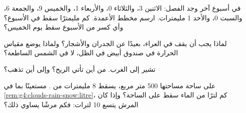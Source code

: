 \begin{exercise}[$\star\star$]\label{exo:g4:clouds-rain-snow:8}
في أسبوع آخر وجد الفصل: الاثنين 3، والثلاثاء 0، والأربعاء 1، والخميس
9، والجمعة 6، والسبت 0، والأحد 1 مليمترات. ارسم مخطط الأعمدة. كم
مليمترًا سقط في الأسبوع؟ وأي كسر من  الأسبوع سقط يوم
الخميس؟
\end{exercise}

\begin{exercise}[$\star\star$]\label{exo:g4:clouds-rain-snow:9}
لماذا يجب أن يقف  في العراء، بعيدًا عن الجدران والأشجار؟ ولماذا
يوضع مقياس الحرارة في صندوق أبيض في الظل، لا في الشمس الساطعة؟
\end{exercise}

\begin{exercise}[$\star\star$]\label{exo:g4:clouds-rain-snow:10}
 تشير إلى الغرب. من أين تأتي الريح؟ وإلى أين
تذهب؟
\end{exercise}

\begin{exercise}[$\star\star\star$]\label{exo:g4:clouds-rain-snow:11}
على ساحة مساحتها 500 متر مربع، يسقط 8 مليمترات من . مستعينًا
بما في \cref{rem:g4:clouds-rain-snow:litre}، كم لترًا من الماء سقط على
الساحة؟ وإذا كان المرش يتسع 10 لترات: فكم مرشًا يساوي ذلك؟
\end{exercise}
